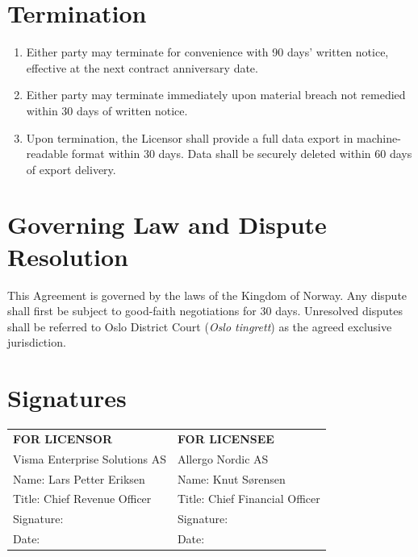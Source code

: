 \documentclass[a4paper,11pt]{article}
\begin{document}
\section{Termination}

\begin{enumerate}[leftmargin=*, label=\arabic{*}.]
  \item Either party may terminate for convenience with 90 days' written notice, effective
    at the next contract anniversary date.
  \item Either party may terminate immediately upon material breach not remedied within
    30 days of written notice.
  \item Upon termination, the Licensor shall provide a full data export in machine-readable
    format within 30 days. Data shall be securely deleted within 60 days of export delivery.
\end{enumerate}

\section{Governing Law and Dispute Resolution}

This Agreement is governed by the laws of the Kingdom of Norway. Any dispute shall first be
subject to good-faith negotiations for 30 days. Unresolved disputes shall be referred to
Oslo District Court (\textit{Oslo tingrett}) as the agreed exclusive jurisdiction.

\section{Signatures}

\vspace{12pt}
\begin{tabularx}{\textwidth}{XX}
  \rowcolor{brand}\color{white}\textbf{FOR LICENSOR} &
  \rowcolor{brand}\color{white}\textbf{FOR LICENSEE} \\[12pt]
  Visma Enterprise Solutions AS & Allergo Nordic AS \\[8pt]
  Name: Lars Petter Eriksen & Name: Knut Sørensen \\
  Title: Chief Revenue Officer & Title: Chief Financial Officer \\[16pt]
  Signature: \underline{\hspace{6cm}} & Signature: \underline{\hspace{6cm}} \\[8pt]
  Date: \underline{\hspace{4cm}} & Date: \underline{\hspace{4cm}} \\
\end{tabularx}

\label{lastpage}
\end{document}
